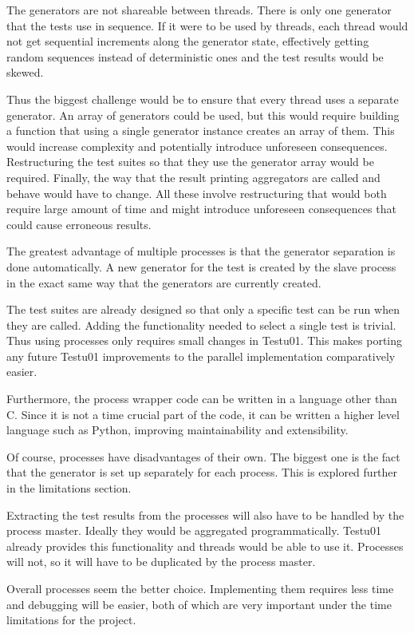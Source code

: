The generators are not shareable between threads. There is only one generator that the tests use in sequence. If it were to be used by threads, each thread would not get sequential increments along the generator state, effectively getting random sequences instead of deterministic ones and the test results would be skewed.

Thus the biggest challenge would be to ensure that every thread uses a separate generator. An array of generators could be used, but this would require building a function that using a single generator instance creates an array of them. This would increase complexity and potentially introduce unforeseen consequences. Restructuring the test suites so that they use the generator array would be required. Finally, the way that the result printing aggregators are called and behave would have to change. All these involve restructuring that would both require large amount of time and might introduce unforeseen consequences that could cause erroneous results.

The greatest advantage of multiple processes is that the generator separation is done automatically. A new generator for the test is created by the slave process in the exact same way that the generators are currently created.

The test suites are already designed so that only a specific test can be run when they are called. Adding the functionality needed to select a single test is trivial. Thus using processes only requires small changes in Testu01. This makes porting any future Testu01 improvements to the parallel implementation comparatively easier.

Furthermore, the process wrapper code can be written in a language other than C. Since it is not a time crucial part of the code, it can be written a higher level language such as Python, improving maintainability and extensibility.

Of course, processes have disadvantages of their own. The biggest one is the fact that the generator is set up separately for each process. This is explored further in the limitations section.

Extracting the test results from the processes will also have to be handled by the process master. Ideally they would be aggregated programmatically. Testu01 already provides this functionality and threads would be able to use it. Processes will not, so it will have to be duplicated by the process master.

Overall processes seem the better choice. Implementing them requires less time and debugging will be easier, both of which are very important under the time limitations for the project.

